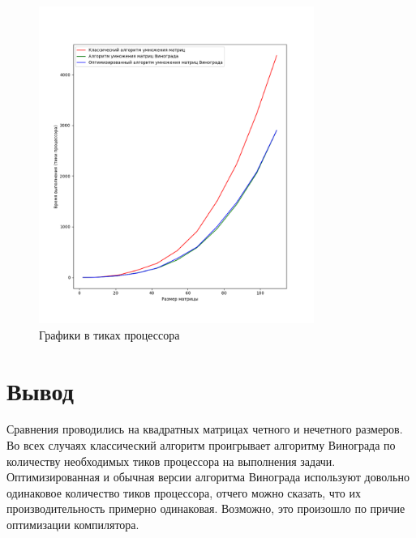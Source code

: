 \clearpage

\begin{figure}[h]
    \centering
    \includegraphics[width=0.8\textwidth]{images/Figure_1}
    \caption{Графики в тиках процессора}
    \label{fig:images-Figure_1}
\end{figure}

\section{Вывод}

Сравнения проводились на квадратных матрицах четного и нечетного размеров. Во всех случаях
классический алгоритм проигрывает алгоритму Винограда по количеству необходимых тиков
процессора на выполнения задачи. Оптимизированная и обычная версии алгоритма Винограда
используют довольно одинаковое количество тиков процессора, отчего можно сказать,
что их производительность примерно одинаковая. Возможно, это произошло по причие оптимизации
компилятора.

